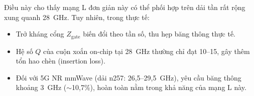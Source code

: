 \documentclass[12pt,a4paper]{article}
\begin{document}
Điều này cho thấy mạng L đơn giản này có thể phối hợp trên dải tần rất rộng xung quanh 28~GHz. Tuy nhiên, trong thực tế:
\begin{itemize}
    \item Trở kháng cổng $Z_{\text{gate}}$ biến đổi theo tần số, thu hẹp băng thông thực tế.
    \item Hệ số $Q$ của cuộn xoắn on-chip tại 28~GHz thường chỉ đạt 10--15, gây thêm tổn hao chèn (insertion loss).
    \item Đối với 5G NR mmWave (dải n257: 26,5--29,5~GHz), yêu cầu băng thông khoảng 3~GHz ($\sim$10,7\%), hoàn toàn nằm trong khả năng của mạng L này.
\end{itemize}
\end{document}
